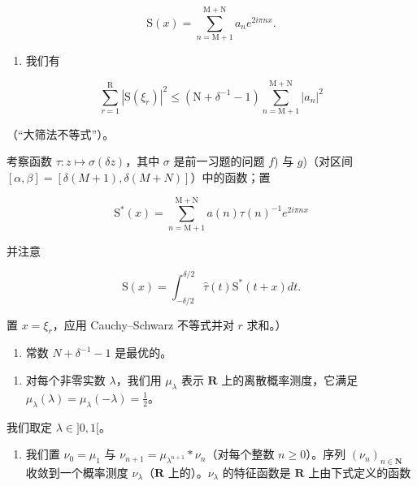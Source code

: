 \[
\mathrm{S} (x) = \sum_ {n = \mathrm{M} + 1} ^ {\mathrm{M} + \mathrm{N}} a _ {n} e ^ {2 i \pi n x}.
\]

\begin{enumerate}
\def\labelenumi{\alph{enumi})}
\tightlist
\item
  我们有
\end{enumerate}

\[
\sum_ {r = 1} ^ {\mathrm{R}} | \mathrm{S} (\xi_ {r}) | ^ {2} \leqslant (\mathrm{N} + \delta^ {- 1} - 1) \sum_ {n = \mathrm{M} + 1} ^ {\mathrm{M} + \mathrm{N}} | a _ {n} | ^ {2}
\]

（“大筛法不等式”）。

考察函数 \(\tau\colon z\mapsto\sigma(\delta z)\)，其中 \(\sigma\) 是前一习题的问题 \(f\)) 与 \(g\))（对区间 \([\alpha,\beta]=[ \delta(M+1),\delta(M+N)]\)）中的函数；置

\[
\mathrm{S} ^ {*} (x) = \sum_ {n = \mathrm{M} + 1} ^ {\mathrm{M} + \mathrm{N}} a (n) \tau (n) ^ {- 1} e ^ {2 i \pi n x}
\]

并注意

\[
\mathrm{S} (x) = \int_ {- \delta / 2} ^ {\delta / 2} \widehat {\tau} (t) \mathrm{S} ^ {*} (t + x) d t.
\]

置 \(x = \xi_r\)，应用 Cauchy–Schwarz 不等式并对 \(r\) 求和。）

\begin{enumerate}
\def\labelenumi{\alph{enumi})}
\setcounter{enumi}{1}
\tightlist
\item
  常数 \(N + \delta^{-1} - 1\) 是最优的。
\end{enumerate}

\begin{enumerate}
\def\labelenumi{\arabic{enumi})}
\setcounter{enumi}{57}
\tightlist
\item
  对每个非零实数 \(\lambda\)，我们用 \(\mu_{\lambda}\) 表示 \(\mathbf{R}\) 上的离散概率测度，它满足 \(\mu_{\lambda}(\lambda) = \mu_{\lambda}(-\lambda) = \frac{1}{2}\)。
\end{enumerate}

我们取定 \(\lambda \in ]0,1[\)。

\begin{enumerate}
\def\labelenumi{\alph{enumi})}
\tightlist
\item
  我们置 \(\nu_0 = \mu_1\) 与 \(\nu_{n+1} = \mu_{\lambda^{n+1}} * \nu_n\)（对每个整数 \(n \geqslant 0\)）。序列 \((\nu_n)_{n \in \mathbf{N}}\) 收敛到一个概率测度 \(\nu_\lambda\)（\(\mathbf{R}\) 上的）。\(\nu_\lambda\) 的特征函数是 \(\mathbf{R}\) 上由下式定义的函数
\end{enumerate}

